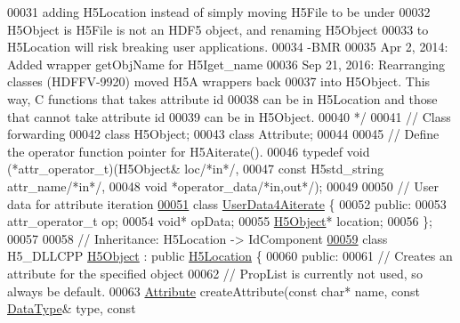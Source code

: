 \begin{DoxyCode}
00031 \textcolor{comment}{                adding H5Location instead of simply moving H5File to be under}
00032 \textcolor{comment}{                H5Object is H5File is not an HDF5 object, and renaming H5Object}
00033 \textcolor{comment}{                to H5Location will risk breaking user applications.}
00034 \textcolor{comment}{                -BMR}
00035 \textcolor{comment}{        Apr 2, 2014: Added wrapper getObjName for H5Iget\_name }
00036 \textcolor{comment}{        Sep 21, 2016: Rearranging classes (HDFFV-9920) moved H5A wrappers back}
00037 \textcolor{comment}{                into H5Object.  This way, C functions that takes attribute id}
00038 \textcolor{comment}{                can be in H5Location and those that cannot take attribute id}
00039 \textcolor{comment}{                can be in H5Object.}
00040 \textcolor{comment}{*/}
00041 \textcolor{comment}{// Class forwarding}
00042 \textcolor{keyword}{class }H5Object;
00043 \textcolor{keyword}{class }Attribute;
00044 
00045 \textcolor{comment}{// Define the operator function pointer for H5Aiterate().}
00046 \textcolor{keyword}{typedef} void (*attr\_operator\_t)(H5Object& loc\textcolor{comment}{/*in*/},
00047                                  \textcolor{keyword}{const} H5std\_string attr\_name\textcolor{comment}{/*in*/},
00048                                  \textcolor{keywordtype}{void} *operator\_data\textcolor{comment}{/*in,out*/});
00049 
00050 \textcolor{comment}{// User data for attribute iteration}
\hyperlink{class_h5_1_1_user_data4_aiterate}{00051} \textcolor{keyword}{class }\hyperlink{class_h5_1_1_user_data4_aiterate}{UserData4Aiterate} \{
00052     \textcolor{keyword}{public}:
00053         attr\_operator\_t op;
00054         \textcolor{keywordtype}{void}* opData;
00055         \hyperlink{class_h5_1_1_h5_object}{H5Object}* location;
00056 \};
00057 
00058 \textcolor{comment}{//  Inheritance: H5Location -> IdComponent}
\hyperlink{class_h5_1_1_h5_object}{00059} \textcolor{keyword}{class }H5\_DLLCPP \hyperlink{class_h5_1_1_h5_object}{H5Object} : \textcolor{keyword}{public} \hyperlink{class_h5_1_1_h5_location}{H5Location} \{
00060    \textcolor{keyword}{public}:
00061         \textcolor{comment}{// Creates an attribute for the specified object}
00062         \textcolor{comment}{// PropList is currently not used, so always be default.}
00063         \hyperlink{class_h5_1_1_attribute}{Attribute} createAttribute(\textcolor{keyword}{const} \textcolor{keywordtype}{char}* name, \textcolor{keyword}{const} \hyperlink{class_h5_1_1_data_type}{DataType}& type, \textcolor{keyword}{const} 

\end{DoxyCode}

